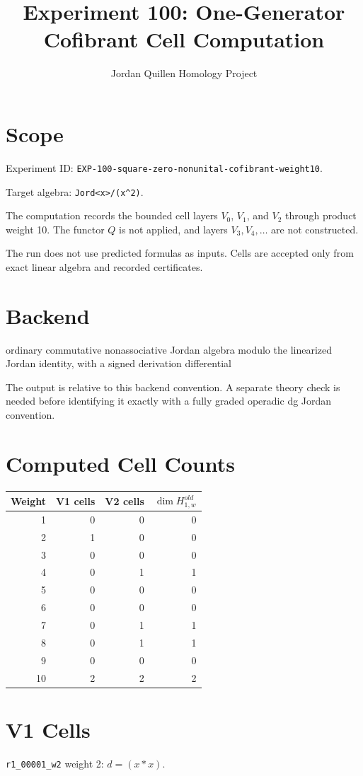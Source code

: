 \documentclass[11pt]{article}
\title{Experiment 100: One-Generator Cofibrant Cell Computation}
\author{Jordan Quillen Homology Project}
\date{}
\begin{document}
\maketitle
\section*{Scope}
Experiment ID: \texttt{EXP-100-square-zero-nonunital-cofibrant-weight10}.

Target algebra: \texttt{Jord<x>/(x^2)}.

The computation records the bounded cell layers $V_0$, $V_1$, and $V_2$ through product weight 10. The functor $Q$ is not applied, and layers $V_3,V_4,\ldots$ are not constructed.

The run does not use predicted formulas as inputs.  Cells are accepted only from exact linear algebra and recorded certificates.
\section*{Backend}
ordinary commutative nonassociative Jordan algebra modulo the linearized Jordan identity, with a signed derivation differential

The output is relative to this backend convention. A separate theory check is needed before identifying it exactly with a fully graded operadic dg Jordan convention.
\section*{Computed Cell Counts}
\begin{tabular}{rrrr}
\toprule
Weight & V1 cells & V2 cells & $\dim H^{old}_{1,w}$ \\
\midrule
1 & 0 & 0 & 0 \\
2 & 1 & 0 & 0 \\
3 & 0 & 0 & 0 \\
4 & 0 & 1 & 1 \\
5 & 0 & 0 & 0 \\
6 & 0 & 0 & 0 \\
7 & 0 & 1 & 1 \\
8 & 0 & 1 & 1 \\
9 & 0 & 0 & 0 \\
10 & 2 & 2 & 2 \\
\bottomrule
\end{tabular}
\section*{V1 Cells}
\texttt{r1\_00001\_w2} weight 2: $d=(x*x)$.
\end{document}
